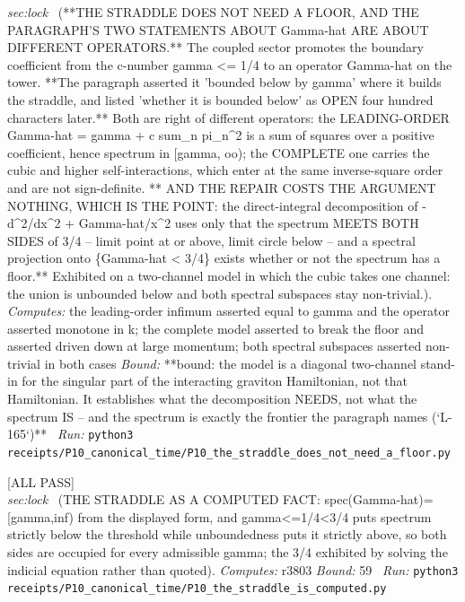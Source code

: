 \begin{description}
\textit{sec:lock} \ (**THE STRADDLE DOES NOT NEED A FLOOR, AND THE PARAGRAPH'S TWO STATEMENTS ABOUT Gamma-hat ARE ABOUT DIFFERENT OPERATORS.** The coupled sector promotes the boundary coefficient from the c-number gamma <= 1/4 to an operator Gamma-hat on the tower. **The paragraph asserted it 'bounded below by gamma' where it builds the straddle, and listed 'whether it is bounded below' as OPEN four hundred characters later.** Both are right of different operators: the LEADING-ORDER Gamma-hat = gamma + c sum\_n pi\_n\textasciicircum{}2 is a sum of squares over a positive coefficient, hence spectrum in [gamma, oo); the COMPLETE one carries the cubic and higher self-interactions, which enter at the same inverse-square order and are not sign-definite. ** AND THE REPAIR COSTS THE ARGUMENT NOTHING, WHICH IS THE POINT: the direct-integral decomposition of -d\textasciicircum{}2/dx\textasciicircum{}2 + Gamma-hat/x\textasciicircum{}2 uses only that the spectrum MEETS BOTH SIDES of 3/4 -- limit point at or above, limit circle below -- and a spectral projection onto \{Gamma-hat < 3/4\} exists whether or not the spectrum has a floor.** Exhibited on a two-channel model in which the cubic takes one channel: the union is unbounded below and both spectral subspaces stay non-trivial.). 
\emph{Computes:} the leading-order infimum asserted equal to gamma and the operator asserted monotone in k; the complete model asserted to break the floor and asserted driven down at large momentum; both spectral subspaces asserted non-trivial in both cases
 \emph{Bound:} **bound: the model is a diagonal two-channel stand-in for the singular part of the interacting graviton Hamiltonian, not that Hamiltonian. It establishes what the decomposition NEEDS, not what the spectrum IS -- and the spectrum is exactly the frontier the paragraph names (`L-165`)**
\ \emph{Run:} \texttt{python3 receipts/P10\_canonical\_time/P10\_the\_straddle\_does\_not\_need\_a\_floor.py}
\item[\rcptlabel{P10_the_straddle_is_computed}{P10R13}\textbf{P10R13}\quad\texttt{P10\_the\_straddle\_is\_computed}]\hfill\textsf{[ALL PASS]}\\
\textit{sec:lock} \ (THE STRADDLE AS A COMPUTED FACT: spec(Gamma-hat)=[gamma,inf) from the displayed form, and gamma<=1/4<3/4 puts spectrum strictly below the threshold while unboundedness puts it strictly above, so both sides are occupied for every admissible gamma; the 3/4 exhibited by solving the indicial equation rather than quoted). 
\emph{Computes:} r3803
 \emph{Bound:} 59
\ \emph{Run:} \texttt{python3 receipts/P10\_canonical\_time/P10\_the\_straddle\_is\_computed.py}

\end{description}
